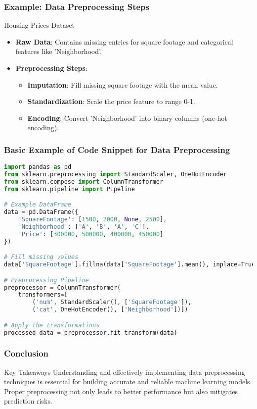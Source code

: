 \documentclass{beamer}
\begin{document}
\begin{frame}[fragile]
    \frametitle{Example: Data Preprocessing Steps}
    \begin{block}{Housing Prices Dataset}
        \begin{itemize}
            \item \textbf{Raw Data}: Contains missing entries for square footage and categorical features like 'Neighborhood'.
            \item \textbf{Preprocessing Steps}:
                \begin{itemize}
                    \item \textbf{Imputation}: Fill missing square footage with the mean value.
                    \item \textbf{Standardization}: Scale the price feature to range 0-1.
                    \item \textbf{Encoding}: Convert 'Neighborhood' into binary columns (one-hot encoding).
                \end{itemize}
        \end{itemize}
    \end{block}
\end{frame}

\begin{frame}[fragile]
    \frametitle{Basic Example of Code Snippet for Data Preprocessing}
    \begin{lstlisting}[language=Python]
import pandas as pd
from sklearn.preprocessing import StandardScaler, OneHotEncoder
from sklearn.compose import ColumnTransformer
from sklearn.pipeline import Pipeline

# Example DataFrame
data = pd.DataFrame({
    'SquareFootage': [1500, 2000, None, 2500],
    'Neighborhood': ['A', 'B', 'A', 'C'],
    'Price': [300000, 500000, 400000, 450000]
})

# Fill missing values
data['SquareFootage'].fillna(data['SquareFootage'].mean(), inplace=True)

# Preprocessing Pipeline
preprocessor = ColumnTransformer(
    transformers=[
        ('num', StandardScaler(), ['SquareFootage']),
        ('cat', OneHotEncoder(), ['Neighborhood'])])

# Apply the transformations
processed_data = preprocessor.fit_transform(data)
    \end{lstlisting}
\end{frame}

\begin{frame}[fragile]
    \frametitle{Conclusion}
    \begin{block}{Key Takeaways}
        Understanding and effectively implementing data preprocessing techniques is essential for building accurate and reliable machine learning models. Proper preprocessing not only leads to better performance but also mitigates prediction risks.
    \end{block}
\end{frame}
\end{document}
